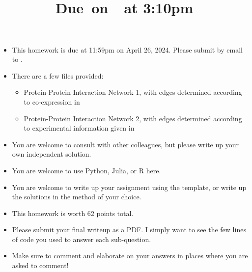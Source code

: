 \documentclass{article}
\title{
    \vspace{2in}
    \textmd{\textbf{\hmwkClass\hmwkTitle}}\\
    \normalsize\vspace{0.1in}\small{Due\ on\ \hmwkDueDate\ at 3:10pm}\\
    \vspace{3in}
}
\author{\hmwkAuthorName}
\date{}
\begin{document}

\begin{itemize}
\item This homework is due at 11:59pm on April 26, 2024. Please submit by email to . 
\item There are a few files provided:
\begin{itemize}
\item Protein-Protein Interaction Network 1, with edges determined according to co-expression in 
\item Protein-Protein Interaction Network 2, with edges determined according to experimental information given in 
\end{itemize}
\item You are welcome to consult with other colleagues, but please write up your own independent solution. 
\item You are welcome to use Python, Julia, or R here.
\item You are welcome to write up your assignment using the  template, or write up the solutions in the method of your choice. 
\item This homework is worth 62 points total. 
\item Please submit your final writeup as a PDF. I simply want to see the few lines of code you used to answer each sub-question.
\item Make sure to comment and elaborate on your answers in places where you are asked to comment! 
\end{itemize}
\end{document}
